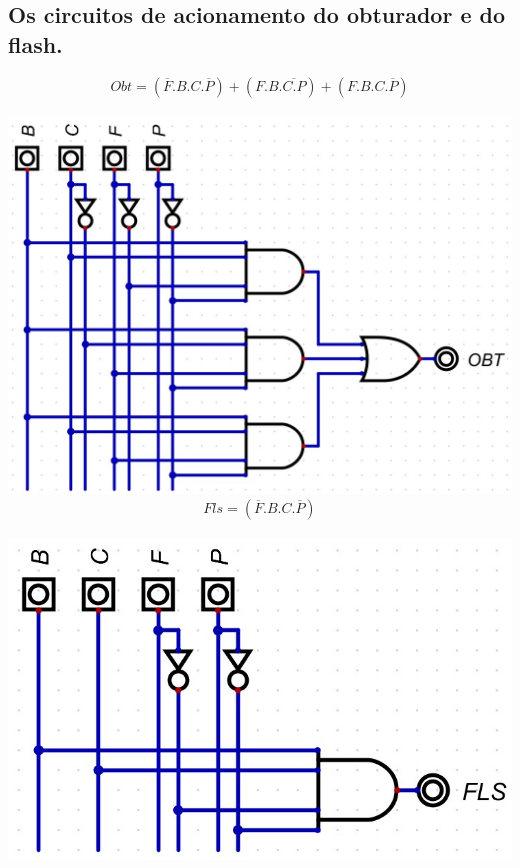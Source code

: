 \documentclass{article}
\begin{document}
		\subsection{Os circuitos de acionamento do obturador e do flash.}
			\begin{equation*}
				Obt = (\overline{F}.B.C.\overline{P})+(F.B.\overline{C.P})+(F.B.C.\overline{P})
			\end{equation*}
			\\
			\includegraphics[scale=0.6]{images/OBT.jpg}
			\\
			\pagebreak
			\begin{equation*}
				Fls =
				(\overline{F}.B.C.\overline{P})
			\end{equation*}
			\\
			\includegraphics[scale=0.65]{images/FLS.jpg}
\end{document}
